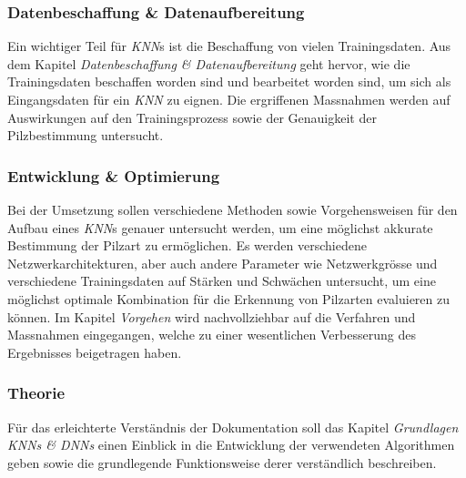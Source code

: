 \subsubsection{Datenbeschaffung \& Datenaufbereitung}
Ein wichtiger Teil für \textit{KNN}s ist die Beschaffung von vielen Trainingsdaten. Aus dem Kapitel \textit{Datenbeschaffung \& Datenaufbereitung} geht hervor, wie die Trainingsdaten beschaffen worden sind und bearbeitet worden sind, um sich als Eingangsdaten für ein \textit{KNN} zu eignen. Die ergriffenen Massnahmen werden auf Auswirkungen auf den Trainingsprozess sowie der Genauigkeit der Pilzbestimmung untersucht.

\subsubsection{Entwicklung \& Optimierung}
Bei der Umsetzung sollen verschiedene Methoden sowie Vorgehensweisen für den Aufbau eines \textit{KNN}s genauer untersucht werden, um eine möglichst akkurate Bestimmung der Pilzart zu ermöglichen. Es werden verschiedene Netzwerkarchitekturen, aber auch andere Parameter wie Netzwerkgrösse und verschiedene Trainingsdaten auf Stärken und Schwächen untersucht, um eine möglichst optimale Kombination für die Erkennung von Pilzarten evaluieren zu können. Im Kapitel \textit{Vorgehen} wird nachvollziehbar auf die Verfahren und Massnahmen eingegangen, welche zu einer wesentlichen Verbesserung des Ergebnisses beigetragen haben.

\subsubsection{Theorie}
Für das erleichterte Verständnis der Dokumentation soll das Kapitel \textit{Grundlagen KNNs \& DNNs} einen Einblick in die Entwicklung der verwendeten Algorithmen geben sowie die grundlegende Funktionsweise derer verständlich beschreiben. 



